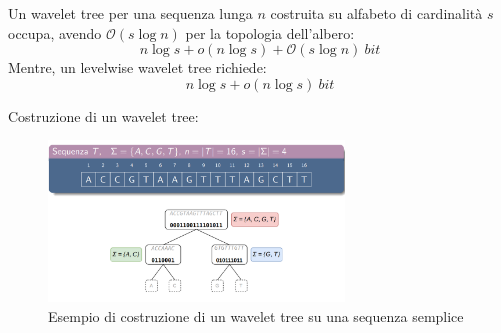 Un wavelet tree per una sequenza lunga $n$ costruita su alfabeto di cardinalità
$s$ occupa, avendo $\mathcal{O}(s \log n)$ per la topologia dell'albero:
\begin{equation}
    n \log s + o(n \log s) + \mathcal{O}(s \log n) \ bit
\end{equation}
Mentre, un levelwise wavelet tree richiede:
\begin{equation}
    n \log s + o(n \log s) \ bit
\end{equation}
\begin{esempio}
    Costruzione di un wavelet tree:
    \begin{figure}[!ht]
        \centering
        \includegraphics[width=0.7\textwidth]{img/Strutture Dati/wavelet tree.png}
        \caption{Esempio di costruzione di un wavelet tree su una sequenza semplice}
    \end{figure}
\end{esempio}
